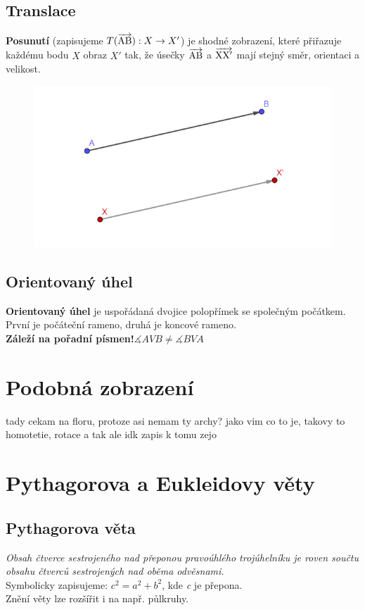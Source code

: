 \documentclass[12pt, a4paper]{article}
\begin{document}
\subsection*{Translace}
\textbf{Posunutí} (zapisujeme $T(\overrightarrow{\rm AB}): X \rightarrow X'$) je shodné zobrazení, které přiřazuje každému bodu $X$ obraz $X'$ tak, že úsečky $\overrightarrow{\rm AB}$ a 
$\overrightarrow{\rm XX'}$ mají stejný směr, orientaci a velikost.\\
\begin{figure}[H]
\includegraphics[scale=0.8]{translace}
\end{figure}

\subsection*{Orientovaný úhel}
\textbf{Orientovaný úhel} je uspořádaná dvojice polopřímek se společným počátkem. První je počáteční rameno, druhá je koncové rameno.\\
\textbf{Záleží na pořadní písmen!}$\measuredangle{AVB}\neq\measuredangle{BVA}$

\section{Podobná zobrazení}
tady cekam na floru, protoze asi nemam ty archy? jako vim co to je, takovy to homotetie, rotace a tak ale idk zapis k tomu zejo
\section{Pythagorova a Eukleidovy věty}

\subsection*{Pythagorova věta}
\textit{Obsah čtverce sestrojeného nad přeponou pravoúhlého trojúhelníku je roven součtu obsahu čtverců sestrojených nad oběma odvěsnami.}\\
Symbolicky zapisujeme: $c^2=a^2+b^2$, kde \textit{c} je přepona.\\
Znění věty lze rozšířit i na např. půlkruhy.
\end{document}
